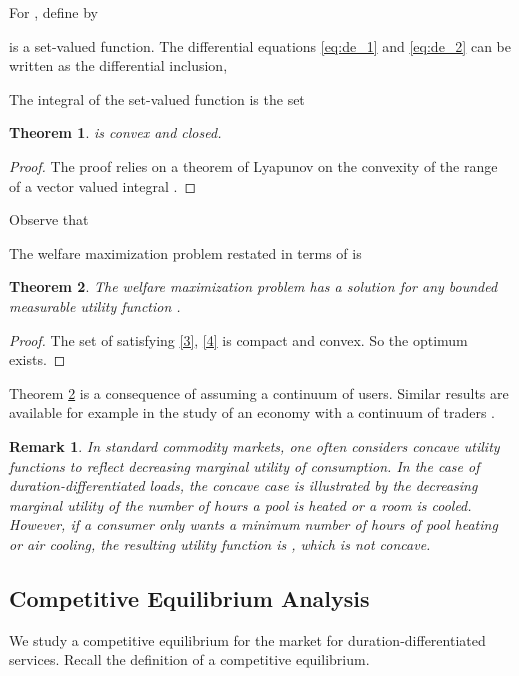 \documentclass[10pt,draftcls,onecolumn]{IEEEtran}
\newtheorem{theorem}{Theorem}
\newtheorem{remark}{Remark}
\newcounter{l1}
\newcounter{l2}
\newcounter{l3}
\begin{document}
For , define  by

 is a set-valued function. 
The differential equations \eqref{eq:de_1} and \eqref{eq:de_2} can be
written as the differential inclusion,

 The integral of the set-valued function  is  the set
 
\begin{theorem}
 is convex and closed.  
\end{theorem}
\begin{proof}
The proof relies on a theorem of Lyapunov on the convexity of the range of a vector
 valued integral \cite{aumann65}.
\end{proof}
Observe that
  


The welfare maximization problem restated in terms of  is


\begin{theorem} \label{theorem5}
The welfare maximization problem has a solution for any bounded measurable utility function .
\end{theorem}
\begin{proof}
The set of  satisfying \eqref{3}, \eqref{4} is compact and convex.  So the optimum  exists.  
\end{proof}
Theorem \ref{theorem5}  is a  consequence of assuming a continuum of users. Similar results are available for example in the study of an economy with a continuum of traders \cite{aumann2}.

\begin{remark}{\rm 
In standard commodity markets, one often considers concave utility functions to reflect decreasing marginal utility of consumption. In the case of duration-differentiated loads, the concave case is illustrated by the decreasing marginal utility  of the number of hours a pool is heated or a room is cooled.  However,
if a consumer only wants a minimum number of hours of pool heating or air cooling, the resulting utility function is
, which  is not concave.}
\end{remark}


\subsection{Competitive Equilibrium Analysis}
We study a competitive equilibrium for the market for duration-differentiated services.   Recall the definition of a competitive equilibrium.
\end{document}
